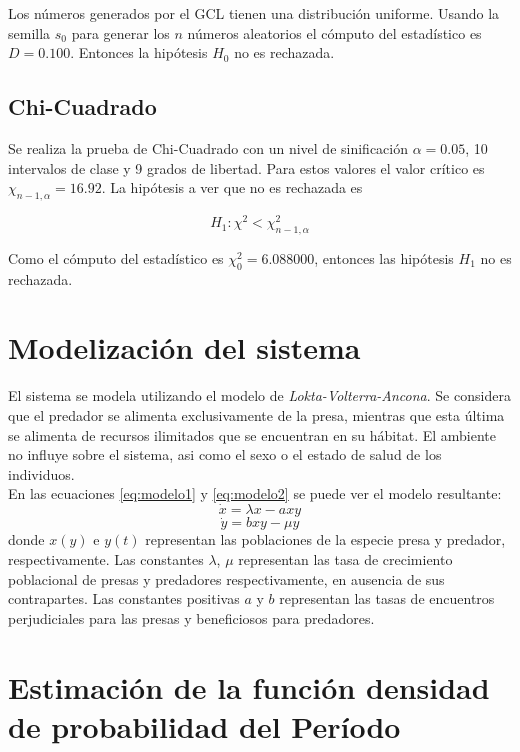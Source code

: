 \documentclass{SPANISH_acm_proc_article-sp}
\begin{document}
Los n\'umeros generados por el GCL tienen una distribuci\'on uniforme. Usando la semilla $s_{0}$ para generar los $n$ n\'umeros aleatorios el c\'omputo del estad\'istico es $D = 0.100$. Entonces la hip\'otesis $H_{0}$ no es rechazada. 

\subsection{Chi-Cuadrado}
Se realiza la prueba de Chi-Cuadrado con un nivel de sinificaci\'on $\alpha = 0.05$, 10 intervalos de clase y 9 grados de libertad. Para estos valores el valor cr\'itico es $\chi_{n-1, \alpha} = 16.92$. La hip\'otesis a ver que no es rechazada es 

\begin{equation}
		H_{1}: \chi^2 < \chi^2_{n - 1, \alpha}
\end{equation}

Como el c\'omputo del estad\'istico es $\chi^2_{0} = 6.088000$, entonces las hip\'otesis $H_{1}$ no es rechazada.

\section{Modelizaci\'on del sistema}
\label{sec:modelo}
El sistema se modela utilizando el modelo de \textit{Lokta-Volterra-Ancona}. Se considera que el predador
se alimenta exclusivamente de la presa, mientras que esta \'ultima se alimenta de recursos ilimitados
que se encuentran en su h\'abitat. El ambiente no influye sobre el sistema, asi como el sexo o
el estado de salud de los individuos.\\
En las ecuaciones \ref{eq:modelo1} y \ref{eq:modelo2} se puede ver el modelo resultante:
\begin{equation}
\label{eq:modelo1}
\dot{x} = \lambda x - axy
\end{equation}
\begin{equation}
\label{eq:modelo2}
\dot{y} = bxy - \mu y
\end{equation}
donde $x(y)$ e $y(t)$ representan las poblaciones de la especie presa y predador, 
respectivamente. Las constantes $\lambda$, $\mu$ representan las tasa de crecimiento
poblacional de presas y predadores respectivamente, en ausencia de sus contrapartes.
Las constantes positivas $a$ y $b$ representan las tasas de encuentros perjudiciales para 
las presas y beneficiosos para predadores.\\


\section{Estimaci\'on de la funci\'on densidad de probabilidad del Per\'iodo}
\end{document}
